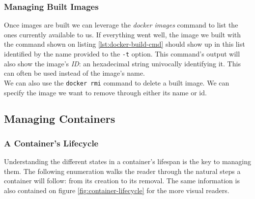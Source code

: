             \subsubsection{Managing Built Images}
                Once images are built we can leverage the \textit{docker images} command to list the ones currently available to us. If everything went well, the image we built with the command shown on listing \ref{lst:docker-build-cmd} should show up in this list identified by the name provided to the \texttt{-t} option. This command's output will also show the image's \textit{ID}: an hexadecimal string univocally identifying it. This can often be used instead of the image's name.\\

                We can also use the \texttt{docker rmi} command to delete a built image. We can specify the image we want to remove through either its name or id.\\

        \subsection{Managing Containers}
            \subsubsection{A Container's Lifecycle}
                Understanding the different states in a container's lifespan is the key to managing them. The following enumeration walks the reader through the natural steps a container will follow: from its creation to its removal. The same information is also contained on figure \ref{fig:container-lifecycle} for the more visual readers.\\


